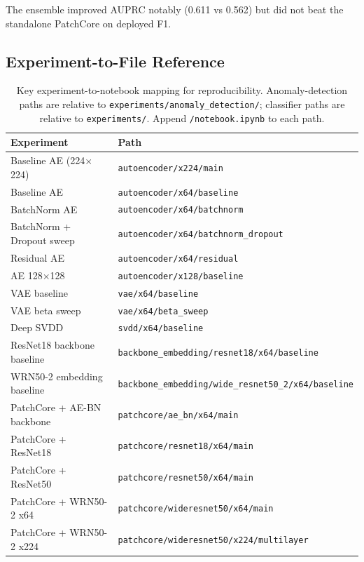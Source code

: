 \documentclass[11pt]{article}
\begin{document}
The ensemble improved AUPRC notably (0.611 vs 0.562) but did not beat the
standalone PatchCore on deployed F1.

\subsection{Experiment-to-File Reference}

\begin{table}[H]
\centering
\caption{Key experiment-to-notebook mapping for reproducibility.
Anomaly-detection paths are relative to \texttt{experiments/anomaly\_detection/};
classifier paths are relative to \texttt{experiments/}.
Append \texttt{/notebook.ipynb} to each path.}
\label{tab:appendix_notebooks}
\begin{tabularx}{\linewidth}{>{\raggedright\arraybackslash}X>{\raggedright\arraybackslash}X}
\toprule
Experiment & Path \\
\midrule
Baseline AE (224$\times$224)
  & \texttt{autoencoder/x224/main} \\
Baseline AE
  & \texttt{autoencoder/x64/baseline} \\
BatchNorm AE
  & \texttt{autoencoder/x64/batchnorm} \\
BatchNorm + Dropout sweep
  & \texttt{autoencoder/x64/batchnorm\_dropout} \\
Residual AE
  & \texttt{autoencoder/x64/residual} \\
AE 128$\times$128
  & \texttt{autoencoder/x128/baseline} \\
VAE baseline
  & \texttt{vae/x64/baseline} \\
VAE beta sweep
  & \texttt{vae/x64/beta\_sweep} \\
Deep SVDD
  & \texttt{svdd/x64/baseline} \\
ResNet18 backbone baseline
  & \texttt{backbone\_embedding/resnet18/x64/baseline} \\
WRN50-2 embedding baseline
  & \texttt{backbone\_embedding/wide\_resnet50\_2/x64/baseline} \\
PatchCore + AE-BN backbone
  & \texttt{patchcore/ae\_bn/x64/main} \\
PatchCore + ResNet18
  & \texttt{patchcore/resnet18/x64/main} \\
PatchCore + ResNet50
  & \texttt{patchcore/resnet50/x64/main} \\
PatchCore + WRN50-2 x64
  & \texttt{patchcore/wideresnet50/x64/main} \\
PatchCore + WRN50-2 x224
  & \texttt{patchcore/wideresnet50/x224/multilayer} \\

\end{tabularx}
\end{table}
\end{document}
